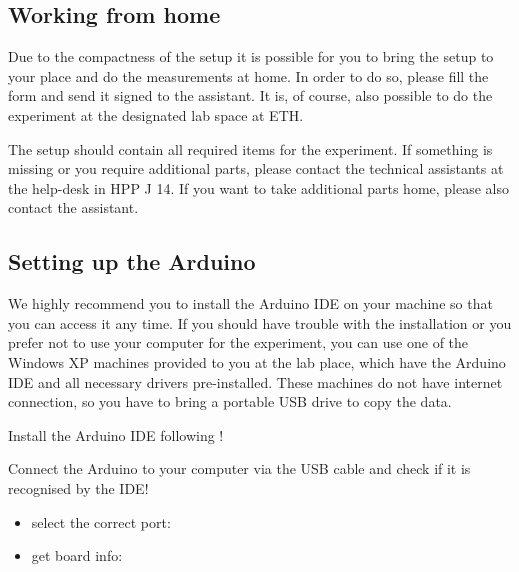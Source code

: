 \subsection{Working from home}
Due to the compactness of the setup it is possible for you to bring the setup to your place and do the measurements at home. In order to do so, please fill the form and send it signed to the assistant. It is, of course, also possible to do the experiment at the designated lab space at ETH.\par
%
The setup should contain all required items for the experiment. If something is missing or you require additional parts, please contact the technical assistants at the help-desk in HPP J 14. If you want to take additional parts home, please also contact the assistant.\par
%
\subsection{Setting up the Arduino}\label{sec:setup}
%
We highly recommend you to install the Arduino \ac{IDE} on your machine so that you can access it any time. If you should have trouble with the installation or you prefer not to use your computer for the experiment, you can use one of the Windows XP machines provided to you at the lab place, which have the Arduino IDE and all necessary drivers pre-installed. These machines do not have internet connection, so you have to bring a portable USB drive to copy the data.
%
\begin{task}
  Install the Arduino \ac{IDE} following !
\end{task}
%
\begin{task}
  Connect the Arduino to your computer via the \ac{USB} cable and check if it is recognised by the \ac{IDE}!
  \begin{itemize}
    \item select the correct port: 
    \item get board info: 
  \end{itemize}
\end{task}
%

